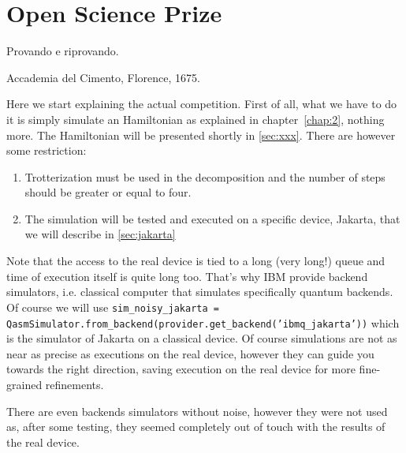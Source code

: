 \chapter{Open Science Prize}\label{chap:3}
\epigraph{ Provando e riprovando.}{Accademia del Cimento, Florence, 1675.}
Here we start explaining the actual competition. First of all, what we have to do it is simply simulate an Hamiltonian as explained in chapter~\ref{chap:2}, nothing more. The Hamiltonian will be presented shortly in \ref{sec:xxx}. There are however some restriction:
\begin{enumerate}
    \item Trotterization must be used in the decomposition and the number of steps should be greater or equal to four.
    \item The simulation will be tested and executed on a specific device, Jakarta, that we will describe in \ref{sec:jakarta}
\end{enumerate}

Note that the access to the real device is tied to a long (very long!) queue and time of execution itself is quite long too. That's why IBM provide backend simulators, i.e. classical computer that simulates specifically quantum backends.
Of course we will use \texttt{sim_noisy_jakarta = QasmSimulator.from_backend(provider.get_backend('ibmq_jakarta'))} which is the simulator of Jakarta on a classical device. Of course simulations are not as near as precise as executions on the real device, however they can guide you towards the right direction, saving execution on the real device for more fine-grained refinements.

There are even backends simulators without noise, however they were not used as, after some testing, they seemed completely out of touch with the results of the real device.




